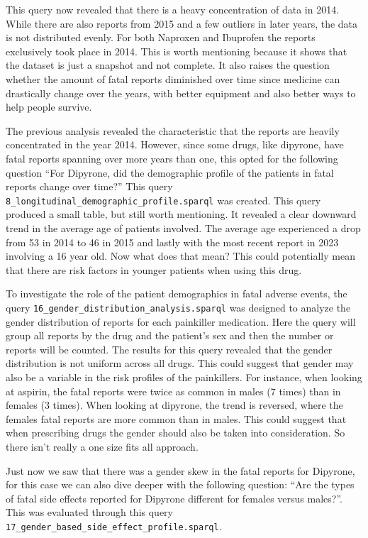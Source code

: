 This query now revealed that there is a heavy concentration of data in 2014. While there are also reports from 2015 and a few outliers in later years, the data is not distributed evenly. For both Naproxen and Ibuprofen the reports exclusively took place in 2014. This is worth mentioning because it shows that the dataset is just a snapshot and not complete. It also raises the question whether the amount of fatal reports diminished over time since medicine can drastically change over the years, with better equipment and also better ways to help people survive.

The previous analysis revealed the characteristic that the reports are heavily concentrated in the year 2014. However, since some drugs, like dipyrone, have fatal reports spanning over more years than one, this opted for the following question “For Dipyrone, did the demographic profile of the patients in fatal reports change over time?” This query \nolinkurl{8_longitudinal_demographic_profile.sparql} was created. This query produced a small table, but still worth mentioning. It revealed a clear downward trend in the average age of patients involved. The average age experienced a drop from 53 in 2014 to 46 in 2015 and lastly with the most recent report in 2023 involving a 16 year old. Now what does that mean? This could potentially mean that there are risk factors in younger patients when using this drug.

To investigate the role of the patient demographics in fatal adverse events, the query \nolinkurl{16_gender_distribution_analysis.sparql} was designed to analyze the gender distribution of reports for each painkiller medication. Here the query will group all reports by the drug and the patient's sex and then the number or reports will be counted. The results for this query revealed that the gender distribution is not uniform across all drugs. This could suggest that gender may also be a variable in the risk profiles of the painkillers. For instance, when looking at aspirin, the fatal reports were twice as common in males (7 times) than in females (3 times). When looking at dipyrone, the trend is reversed, where the females fatal reports are more common than in males.  This could suggest that when prescribing drugs the gender should also be taken into consideration. So there isn't really a one size fits all approach.

Just now we saw that there was a gender skew in the fatal reports for Dipyrone, for this case we can also dive deeper with the following question: “Are the types of fatal side effects reported for Dipyrone different for females versus males?”. This was evaluated through this query \nolinkurl{17_gender_based_side_effect_profile.sparql}.

